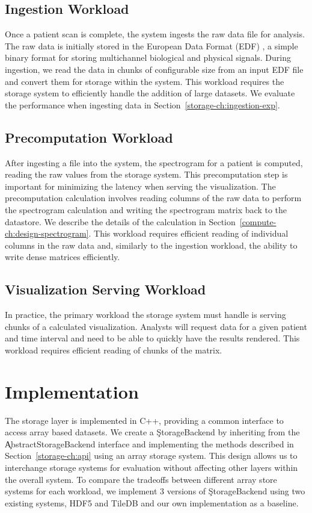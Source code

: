\subsection{Ingestion Workload}

Once a patient scan is complete, the system ingests the raw data file for
analysis. The raw data is initially stored in the European Data Format (EDF)
\cite{edf}, a simple binary format for storing multichannel biological and
physical signals. During ingestion, we read the data in chunks of configurable
size from an input EDF file and convert them for storage within the system.
This workload requires the storage system to efficiently handle the addition of
large datasets. We evaluate the performance when ingesting data in
Section~\ref{storage-ch:ingestion-exp}.

\subsection{Precomputation Workload}

After ingesting a file into the system, the spectrogram for a patient is
computed, reading the raw values from the storage system. This precomputation
step is important for minimizing the latency when serving the visualization.
The precomputation calculation involves reading columns of the raw data to
perform the spectrogram calculation and writing the spectrogram matrix back to
the datastore. We describe the details of the calculation in
Section~\ref{compute-ch:design-spectrogram}. This workload requires efficient
reading of individual columns in the raw data and, similarly to the ingestion
workload, the ability to write dense matrices efficiently.

\subsection{Visualization Serving Workload}

In practice, the primary workload the storage system must handle is serving
chunks of a calculated visualization. Analysts will request data for a given
patient and time interval and need to be able to quickly have the results
rendered. This workload requires efficient reading of chunks of the matrix.

\section{Implementation}

The storage layer is implemented in C++, providing a common interface to access
array based datasets. We create a \c{StorageBackend} by inheriting from the
\c{AbstractStorageBackend} interface and implementing the methods described in
Section~\ref{storage-ch:api} using an array storage system. This design allows
us to interchange storage systems for evaluation without affecting other layers
within the overall system. To compare the tradeoffs between different array
store systems for each workload, we implement 3 versions of \c{StorageBackend}
using two existing systems, HDF5 \cite{hdf5} and TileDB \cite{tiledb} and our
own implementation as a baseline. \\

